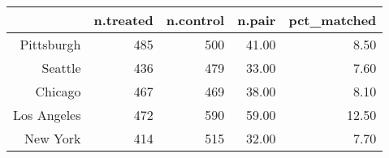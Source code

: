 \begin{table}[ht]
\centering
\begin{tabular}{rrrrr}
  \hline
 & n.treated & n.control & n.pair & pct\_matched \\ 
  \hline
Pittsburgh & 485 & 500 & 41.00 & 8.50 \\ 
  Seattle & 436 & 479 & 33.00 & 7.60 \\ 
  Chicago & 467 & 469 & 38.00 & 8.10 \\ 
  Los Angeles & 472 & 590 & 59.00 & 12.50 \\ 
  New York & 414 & 515 & 32.00 & 7.70 \\ 
   \hline
\end{tabular}
\end{table}
